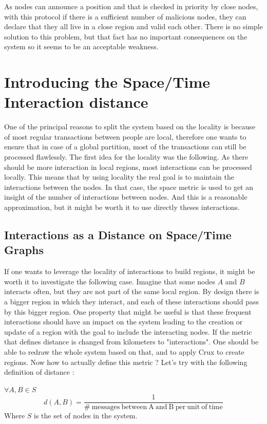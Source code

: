 \documentclass[a4paper,11pt,oneside]{report}
\begin{document}
As nodes can announce a position and that is checked in priority by close
nodes, with this protocol if there is a sufficient number of malicious nodes,
they can declare that they all live in a close region and valid each other.
There is no simple solution to this problem, but that fact has no important consequences
on the system so it seems to be an acceptable weakness.

\section{Introducing the Space/Time Interaction distance}
One of the principal reasons to split the system based on the locality is
because of most regular transactions between people are local, therefore one
wants to ensure that in case of a global partition, most of the transactions
can still be processed flawlessly. The first idea for the locality was the
following. As there should be more interaction in local regions, most
interactions can be processed locally. This means that by using locality the
real goal is to maintain the interactions between the nodes. In that case,
the space metric is used to get an insight of the number of interactions between nodes. And this is a
reasonable approximation, but it might be worth it to use directly 
theses interactions. 

\subsection{Interactions as a Distance on Space/Time Graphs}

If one wants to leverage the locality of interactions to build regions, it
might be worth it to investigate the following case.  Imagine that some nodes
$A$ and $B$ interacts often, but they are not part of the same local
region.  By design there is a bigger region in which they interact, and each of
these interactions should pass by this bigger region. One property that might
be useful is that these frequent interactions should have an impact on the
system leading to the creation or update of a region with the goal to include the interacting nodes. If the
metric that defines distance is changed from kilometers to "interactions". One
should be able to redraw the whole system based on that, and to apply Crux to
create regions. Now how to actually define this metric ? Let's try with the
following definition of distance :


$\forall A,B \in S$
\begin{equation} \label{definition-distance}
    d(A,B) = \frac{1}{ \mathrm{\#\ messages\ between\ A\ and\ B\ per\ unit\ of\ time} } 
\end{equation}
Where $S$ is the set of nodes in the system.
\end{document}
